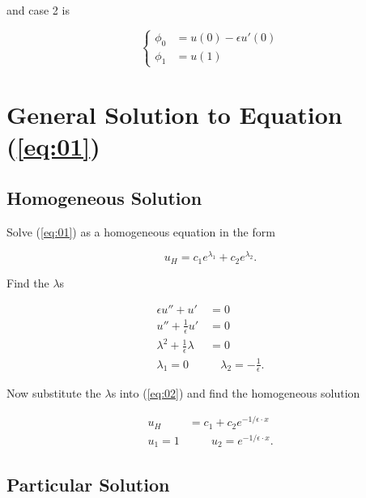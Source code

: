 \documentclass[a4paper, 12pt, reqno]{amsart}
\numberwithin{equation}{section}
\begin{document}
and case 2 is

\begin{equation}\label{eq:bvp2}
    \begin{cases}
        \phi_0 &= u(0) - \epsilon u'(0) \\
        \phi_1 &= u(1)
    \end{cases}
\end{equation}

\section{General Solution to Equation (\ref{eq:01})}

\subsection{Homogeneous Solution}

Solve (\ref{eq:01}) as a homogeneous equation in the form

\begin{equation}\label{eq:02}
    u_H = c_1 e^{\lambda_1} + c_2 e^{\lambda_2}.
\end{equation}

Find the $\lambda$s

\begin{equation}\nonumber
    \begin{aligned}
        \epsilon u'' + u' &= 0          \\
        u'' + \frac{1}{\epsilon} u' &= 0 \\
        \lambda^2 + \frac{1}{\epsilon} \lambda &= 0 \\
        \lambda_1 = 0 \quad & \quad \lambda_2 = - \frac{1}{\epsilon}.
    \end{aligned}
\end{equation}

Now substitute the $\lambda$s into (\ref{eq:02}) and find the homogeneous
solution

\begin{equation}\label{eq:hom}
    \begin{aligned}
        u_H &= c_1 + c_2 e^{-1/\epsilon \cdot x} \\
        u_1 = 1 &\qquad u_2 = e^{-1/\epsilon \cdot x}.
    \end{aligned}
\end{equation}

\subsection{Particular Solution}
\end{document}
